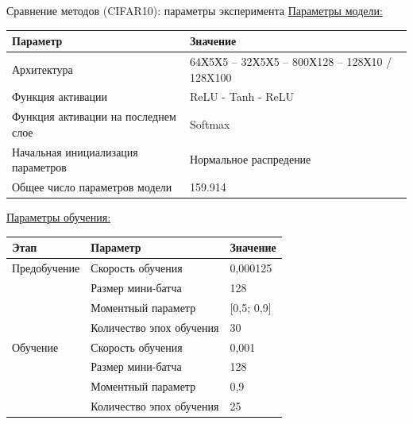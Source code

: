 \documentclass[10pt]{beamer}
\begin{document}
        \begin{frame}{Сравнение методов (CIFAR10): параметры эксперимента}
            \underline{Параметры модели:}
            \begin{table}
            \small
            \begin{tabular}{|p{6cm}|p{5cm}|}
              \hline
                \textbf{Параметр} & \textbf{Значение}\\
                \hline
                Архитектура & 64Х5Х5 -- 32Х5Х5 -- 800Х128 -- 128Х10 / 128X100\\
                \hline
                Функция активации & ReLU - Tanh - ReLU \\
                \hline
                Функция активации на последнем слое & Softmax \\
                \hline
                Начальная инициализация параметров & Нормальное распредение \\
                \hline
                Общее число параметров модели & 159.914
                \\
                \hline
            \end{tabular}
            \end{table}\par
            \underline{Параметры обучения:}
            \begin{table}
            \small
            \begin{tabular}{|p{3cm}|p{5cm}|p{2cm}|}
              \hline
                \textbf{Этап} & \textbf{Параметр} & \textbf{Значение}\\
                \hline
                Предобучение & Скорость обучения & 0,000125\\
                \cline{2-3}
                & Размер мини-батча & 128 \\
                \cline{2-3}
                & Моментный параметр & [0,5; 0,9] \\
                \cline{2-3}
                & Количество эпох обучения & 30\\
                \hline
                Обучение & Скорость обучения & 0,001\\
                \cline{2-3}
                & Размер мини-батча & 128 \\
                \cline{2-3}
                & Моментный параметр & 0,9 \\
                \cline{2-3}
                & Количество эпох обучения & 25\\
                \hline
            \end{tabular}
            \end{table}
        \end{frame}
\end{document}
